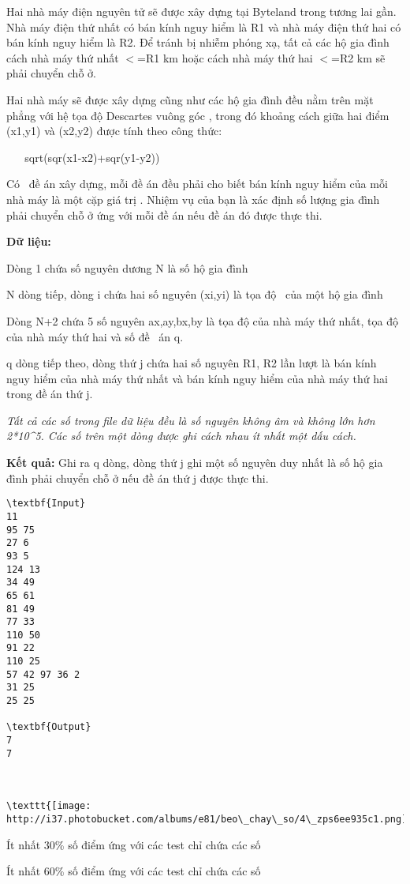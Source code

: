 

Hai nhà máy điện nguyên tử sẽ được xây dựng tại Byteland trong tương lai gần. Nhà máy điện thứ nhất có bán kính nguy hiểm là R1 và nhà máy điện thứ hai có bán kính nguy hiểm là R2. Để tránh bị nhiễm phóng xạ, tất cả các hộ gia đình cách nhà máy thứ nhất $<$=R1 km hoặc cách nhà máy thứ hai $<$=R2 km sẽ phải chuyển chỗ ở.

Hai nhà máy sẽ được xây dựng cũng như các hộ gia đình đều nằm trên mặt phẳng với hệ tọa độ Descartes vuông góc , trong đó khoảng cách giữa hai điểm (x1,y1) và (x2,y2) được tính theo công thức:

    sqrt(sqr(x1-x2)+sqr(y1-y2))

Có  đề án xây dựng, mỗi đề án đều phải cho biết bán kính nguy hiểm của mỗi nhà máy là một cặp giá trị . Nhiệm vụ của bạn là xác định số lượng gia đình phải chuyển chỗ ở ứng với mỗi đề án nếu đề án đó được thực thi.

\textbf{Dữ liệu:} 

Dòng 1 chứa số nguyên dương N là số hộ gia đình

N dòng tiếp, dòng i chứa hai số nguyên (xi,yi) là tọa độ  của một hộ gia đình

Dòng N+2 chứa 5 số nguyên ax,ay,bx,by là tọa độ của nhà máy thứ nhất, tọa độ của nhà máy thứ hai và số đề  án q.

q dòng tiếp theo, dòng thứ j chứa hai số nguyên R1, R2 lần lượt là bán kính nguy hiểm của nhà máy thứ nhất và bán kính nguy hiểm của nhà máy thứ hai trong đề án thứ j.

\emph{Tất cả các số trong file dữ liệu đều là số nguyên không âm và không lớn hơn 2*10\textasciicircum5}\emph{. Các số trên một dòng được ghi cách nhau ít nhất một dấu cách.}

\textbf{Kết quả: }Ghi ra q dòng, dòng thứ j ghi một số nguyên duy nhất là số hộ gia đình phải chuyển chỗ ở nếu đề án thứ j được thực thi.
\begin{verbatim}
\textbf{Input}
11
95 75
27 6
93 5
124 13
34 49
65 61
81 49
77 33
110 50
91 22
110 25
57 42 97 36 2
31 25
25 25

\textbf{Output}
7
7



\texttt{[image: http://i37.photobucket.com/albums/e81/beo\_chay\_so/4\_zps6ee935c1.png]}\end{verbatim}

Ít nhất 30\% số điểm ứng với các test chỉ chứa các số

Ít nhất 60\% số điểm ứng với các test chỉ chứa các số 